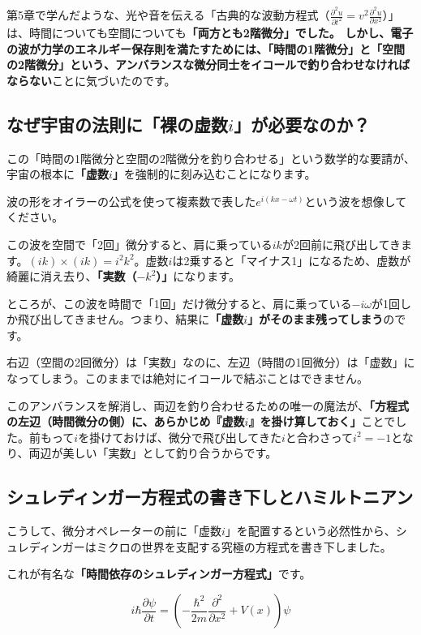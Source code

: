 第5章で学んだような、光や音を伝える「古典的な波動方程式（\(\frac{\partial^2 u}{\partial t^2} = v^2 \frac{\partial^2 u}{\partial x^2}\)）」は、時間についても空間についても\textbf{「両方とも2階微分」でした。 しかし、電子の波が力学のエネルギー保存則を満たすためには、「時間の1階微分」と「空間の2階微分」という、アンバランスな微分同士をイコールで釣り合わせなければならない}ことに気づいたのです。

\subsection{なぜ宇宙の法則に「裸の虚数\(i\)」が必要なのか？}

この「時間の1階微分と空間の2階微分を釣り合わせる」という数学的な要請が、宇宙の根本に\textbf{「虚数\(i\)」}を強制的に刻み込むことになります。

波の形をオイラーの公式を使って複素数で表した\(e^{i(kx - \omega t)}\)という波を想像してください。

この波を空間で「2回」微分すると、肩に乗っている\(ik\)が2回前に飛び出してきます。\((ik) \times (ik) = i^2 k^2\)。虚数\(i\)は2乗すると「マイナス1」になるため、虚数が綺麗に消え去り、\textbf{「実数（\(-k^2\)）」}になります。

ところが、この波を時間で「1回」だけ微分すると、肩に乗っている\(-i\omega\)が1回しか飛び出してきません。つまり、結果に\textbf{「虚数\(i\)」がそのまま残ってしまう}のです。

右辺（空間の2回微分）は「実数」なのに、左辺（時間の1回微分）は「虚数」になってしまう。このままでは絶対にイコールで結ぶことはできません。

このアンバランスを解消し、両辺を釣り合わせるための唯一の魔法が、\textbf{「方程式の左辺（時間微分の側）に、あらかじめ『虚数\(i\)』を掛け算しておく」}ことでした。前もって\(i\)を掛けておけば、微分で飛び出してきた\(i\)と合わさって\(i^2 = -1\)となり、両辺が美しい「実数」として釣り合うからです。

\subsection{シュレディンガー方程式の書き下しとハミルトニアン}

こうして、微分オペレーターの前に「虚数\(i\)」を配置するという必然性から、シュレディンガーはミクロの世界を支配する究極の方程式を書き下しました。

これが有名な\textbf{「時間依存のシュレディンガー方程式」}です。

\[i\hbar \frac{\partial \psi}{\partial t} = \left( -\frac{\hbar^2}{2m} \frac{\partial^2}{\partial x^2} + V(x) \right) \psi\]

